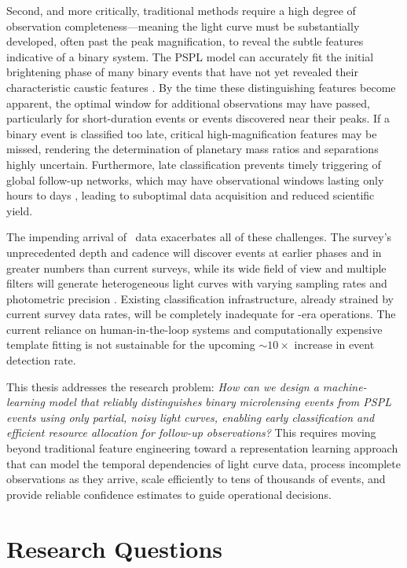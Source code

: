 Second, and more critically, traditional methods require a high degree of observation completeness---meaning the light curve must be substantially developed, often past the peak magnification, to reveal the subtle features indicative of a binary system. The PSPL model can accurately fit the initial brightening phase of many binary events that have not yet revealed their characteristic caustic features \citep{Gaudi2008}. By the time these distinguishing features become apparent, the optimal window for additional observations may have passed, particularly for short-duration events or events discovered near their peaks. If a binary event is classified too late, critical high-magnification features may be missed, rendering the determination of planetary mass ratios and separations highly uncertain. Furthermore, late classification prevents timely triggering of global follow-up networks, which may have observational windows lasting only hours to days \citep{Yee2012,Beaulieu2006}, leading to suboptimal data acquisition and reduced scientific yield.

The impending arrival of \lsst\ data exacerbates all of these challenges. The survey's unprecedented depth and cadence will discover events at earlier phases and in greater numbers than current surveys, while its wide field of view and multiple filters will generate heterogeneous light curves with varying sampling rates and photometric precision \citep{Ivezic2019}. Existing classification infrastructure, already strained by current survey data rates, will be completely inadequate for \lsst-era operations. The current reliance on human-in-the-loop systems and computationally expensive template fitting is not sustainable for the upcoming $\sim\!10\times$ increase in event detection rate.

This thesis addresses the research problem: \emph{How can we design a machine-learning model that reliably distinguishes binary microlensing events from PSPL events using only partial, noisy light curves, enabling early classification and efficient resource allocation for follow-up observations?} This requires moving beyond traditional feature engineering toward a representation learning approach that can model the temporal dependencies of light curve data, process incomplete observations as they arrive, scale efficiently to tens of thousands of events, and provide reliable confidence estimates to guide operational decisions.

\section{Research Questions}
\label{sec:questions}

